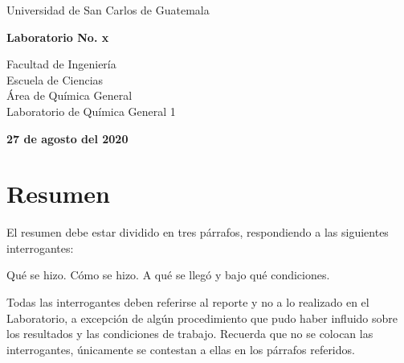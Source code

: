 \documentclass[osajnl,onecolumn,showpacs,superscriptaddress,12pt]{revtex4-1}
\begin{document}
\begin{center}
\begin{Large}
Universidad de San Carlos de Guatemala
\end{Large}
\end{center}



\begin{center}
\begin{Huge}
\textbf{Laboratorio No. x}
\end{Huge}
\end{center}



\begin{center}
\begin{normalsize}
Facultad de Ingeniería\\
Escuela de Ciencias\\
Área de Química General\\
Laboratorio de Química General 1\\
\end{normalsize}
\end{center}



\begin{center}
\textbf{27 de agosto del 2020}
\end{center}

\author{\textbf{Nombre y apellido} \\carnet}

\maketitle{}


\section{Resumen}


El resumen debe estar dividido en tres párrafos, respondiendo a las siguientes interrogantes:\

Qué se hizo.
Cómo se hizo.
A qué se llegó y bajo qué condiciones.\

Todas las interrogantes deben referirse al reporte y no a lo realizado en el Laboratorio, a
excepción de algún procedimiento que pudo haber influido sobre los resultados y las condiciones de
trabajo. Recuerda que no se colocan las interrogantes, únicamente se contestan a ellas en los
párrafos referidos.
\end{document}
